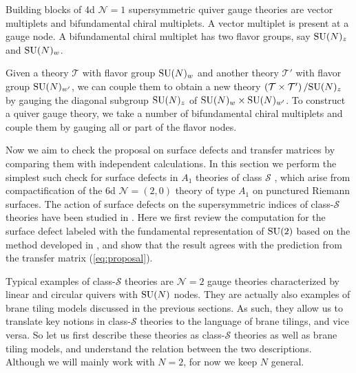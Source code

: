 Building blocks of 4d $\mathcal{N}=1$ supersymmetric quiver gauge
theories are vector multiplets and bifundamental chiral multiplets.
A vector multiplet is present at a gauge node. A bifundamental chiral
multiplet has two flavor groups, say $\mathrm{SU}(N)_{z}$ and $\mathrm{SU}(N)_{w}$.

Given a theory $\mathcal{T}$ with flavor group $\mathrm{SU}(N)_{w}$ and another
theory $\mathcal{T}'$ with flavor group $\mathrm{SU}(N)_{w'}$, we can couple
them to obtain a new theory $\left( \mathcal{T} \times \mathcal{T}' \right)/\mathrm{SU}(N)_{z}$
by gauging the diagonal subgroup $\mathrm{SU}(N)_{z}$ of $\mathrm{SU}(N)_{w} \times \mathrm{SU}(N)_{w'}$.
To construct a quiver gauge theory, we take a number of bifundamental
chiral multiplets and couple them by gauging all or part of the flavor
nodes. 

Now we aim to check the proposal on surface defects and transfer matrices
by comparing them with independent calculations. In this section we
perform the simplest such check for surface defects in $A_{1}$ theories
of class $\mathcal{S}$ \cite{Gaiotto:2009we,Gaiotto:2009hg}, which arise from compactification
of the 6d $\mathcal{N}=\left(2,0\right)$ theory of type $A_{1}$
on punctured Riemann surfaces. The action of surface defects on the
supersymmetric indices of class-$\mathcal{S}$ theories have been
studied in \cite{Gaiotto:2012xa, Gadde:2013dda, Alday:2013kda,Bullimore:2014nla}. Here we first review the computation for the surface
defect labeled with the fundamental representation of $\mathrm{SU}(2)$ based
on the method developed in \cite{Gaiotto:2012xa}, and show that the result agrees
with the prediction from the transfer matrix (\ref{eq:proposal}). 

Typical examples of class-$\mathcal{S}$ theories are $\mathcal{N}=2$
gauge theories characterized by linear and circular quivers with $\mathrm{SU}(N)$
nodes. They are actually also examples of brane tiling models discussed
in the previous sections. As such, they allow us to translate key
notions in class-$\mathcal{S}$ theories to the language of brane
tilings, and vice versa. So let us first describe these theories as
class-$\mathcal{S}$ theories as well as brane tiling models, and
understand the relation between the two descriptions. Although we
will mainly work with $N=2$, for now we keep $N$ general. 

